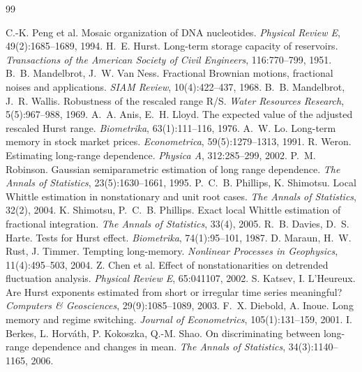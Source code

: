 \documentclass[11pt,a4paper]{article}
\renewcommand{\_}{\textunderscore\penalty0\hspace{0pt}}
\begin{document}
\begin{thebibliography}{99}

 C.-K. Peng et al. Mosaic organization of DNA nucleotides. \textit{Physical Review E}, 49(2):1685--1689, 1994.
 H.~E. Hurst. Long-term storage capacity of reservoirs. \textit{Transactions of the American Society of Civil Engineers}, 116:770--799, 1951.
 B.~B. Mandelbrot, J.~W. Van Ness. Fractional Brownian motions, fractional noises and applications. \textit{SIAM Review}, 10(4):422--437, 1968.
 B.~B. Mandelbrot, J.~R. Wallis. Robustness of the rescaled range R/S. \textit{Water Resources Research}, 5(5):967--988, 1969.
 A.~A. Anis, E.~H. Lloyd. The expected value of the adjusted rescaled Hurst range. \textit{Biometrika}, 63(1):111--116, 1976.
 A.~W. Lo. Long-term memory in stock market prices. \textit{Econometrica}, 59(5):1279--1313, 1991.
 R. Weron. Estimating long-range dependence. \textit{Physica A}, 312:285--299, 2002.
 P.~M. Robinson. Gaussian semiparametric estimation of long range dependence. \textit{The Annals of Statistics}, 23(5):1630--1661, 1995.
 P.~C.~B. Phillips, K. Shimotsu. Local Whittle estimation in nonstationary and unit root cases. \textit{The Annals of Statistics}, 32(2), 2004.
 K. Shimotsu, P.~C.~B. Phillips. Exact local Whittle estimation of fractional integration. \textit{The Annals of Statistics}, 33(4), 2005.
 R.~B. Davies, D.~S. Harte. Tests for Hurst effect. \textit{Biometrika}, 74(1):95--101, 1987.
 D. Maraun, H.~W. Rust, J. Timmer. Tempting long-memory. \textit{Nonlinear Processes in Geophysics}, 11(4):495--503, 2004.
 Z. Chen et al. Effect of nonstationarities on detrended fluctuation analysis. \textit{Physical Review E}, 65:041107, 2002.
 S. Katsev, I. L'Heureux. Are Hurst exponents estimated from short or irregular time series meaningful? \textit{Computers \& Geosciences}, 29(9):1085--1089, 2003.
 F.~X. Diebold, A. Inoue. Long memory and regime switching. \textit{Journal of Econometrics}, 105(1):131--159, 2001.
 I. Berkes, L. Horváth, P. Kokoszka, Q.-M. Shao. On discriminating between long-range dependence and changes in mean. \textit{The Annals of Statistics}, 34(3):1140--1165, 2006.

\end{thebibliography}
\end{document}
